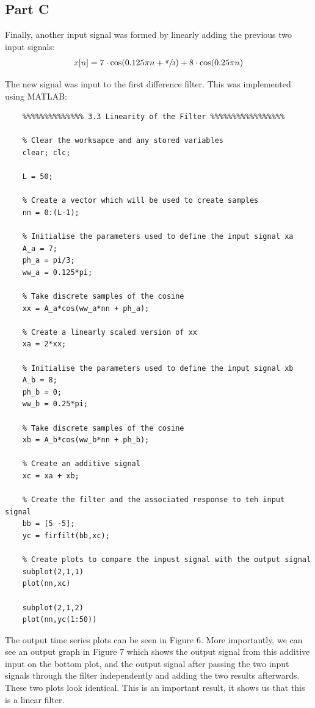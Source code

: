 \documentclass{article}
\begin{document}
\subsection{Part C}
Finally, another input signal was formed by linearly adding the previous two input signals:
\begin{align*}
	x[n] = 7 \cdot \cos(0.125 \pi n + \sfrac{\pi}{3}) + 8 \cdot \cos(0.25 \pi n)
\end{align*}

The new signal was input to the first difference filter. This was implemented using MATLAB:
\begin{lstlisting}
	%%%%%%%%%%%%%% 3.3 Linearity of the Filter %%%%%%%%%%%%%%%%%
	
	% Clear the worksapce and any stored variables
	clear; clc;
	
	L = 50;
	
	% Create a vector which will be used to create samples
	nn = 0:(L-1);
	
	% Initialise the parameters used to define the input signal xa
	A_a = 7;
	ph_a = pi/3;
	ww_a = 0.125*pi;
	
	% Take discrete samples of the cosine
	xx = A_a*cos(ww_a*nn + ph_a);
	
	% Create a linearly scaled version of xx
	xa = 2*xx;
	
	% Initialise the parameters used to define the input signal xb
	A_b = 8;
	ph_b = 0;
	ww_b = 0.25*pi;
	
	% Take discrete samples of the cosine
	xb = A_b*cos(ww_b*nn + ph_b);
	
	% Create an additive signal
	xc = xa + xb;
	
	% Create the filter and the associated response to teh input signal
	bb = [5 -5];
	yc = firfilt(bb,xc);
	
	% Create plots to compare the inpust signal with the output signal
	subplot(2,1,1)
	plot(nn,xc)
	
	subplot(2,1,2)
	plot(nn,yc(1:50))
\end{lstlisting}

The output time series plots can be seen in Figure 6. More importantly, we can see an output graph in Figure 7 which shows the output signal from this additive input on the bottom plot, and the output signal after passing the two input signals through the filter independently and adding the two results afterwards. These two plots look identical. This is an important result, it shows us that this is a linear filter.
\end{document}
